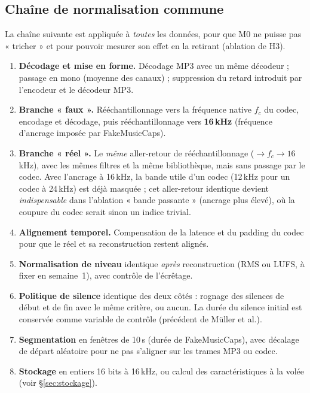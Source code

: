 \documentclass[11pt,a4paper]{article}
\begin{document}
\subsection{Chaîne de normalisation commune}
\label{sec:chaine}

La chaîne suivante est appliquée à \emph{toutes} les données, pour que M0 ne puisse pas « tricher » et pour pouvoir mesurer son effet en la retirant (ablation de H3).

\begin{enumerate}
  \item \textbf{Décodage et mise en forme.} Décodage MP3 avec un même décodeur ; passage en mono (moyenne des canaux) ; suppression du retard introduit par l'encodeur et le décodeur MP3.
  \item \textbf{Branche « faux ».} Rééchantillonnage vers la fréquence native $f_c$ du codec, encodage et décodage, puis rééchantillonnage vers \textbf{16\,kHz} (fréquence d'ancrage imposée par FakeMusicCaps).
  \item \textbf{Branche « réel ».} Le \emph{même} aller-retour de rééchantillonnage ($\to f_c \to 16$\,kHz), avec les mêmes filtres et la même bibliothèque, mais sans passage par le codec. Avec l'ancrage à 16\,kHz, la bande utile d'un codec (12\,kHz pour un codec à 24\,kHz) est déjà masquée ; cet aller-retour identique devient \emph{indispensable} dans l'ablation « bande passante » (ancrage plus élevé), où la coupure du codec serait sinon un indice trivial.
  \item \textbf{Alignement temporel.} Compensation de la latence et du padding du codec pour que le réel et sa reconstruction restent alignés.
  \item \textbf{Normalisation de niveau} identique \emph{après} reconstruction (RMS ou LUFS, à fixer en semaine~1), avec contrôle de l'écrêtage.
  \item \textbf{Politique de silence} identique des deux côtés : rognage des silences de début et de fin avec le même critère, ou aucun. La durée du silence initial est conservée comme variable de contrôle (précédent de Müller et al.).
  \item \textbf{Segmentation} en fenêtres de 10\,s (durée de FakeMusicCaps), avec décalage de départ aléatoire pour ne pas s'aligner sur les trames MP3 ou codec.
  \item \textbf{Stockage} en entiers 16 bits à 16\,kHz, ou calcul des caractéristiques à la volée (voir \S\ref{sec:stockage}).
\end{enumerate}
\end{document}
